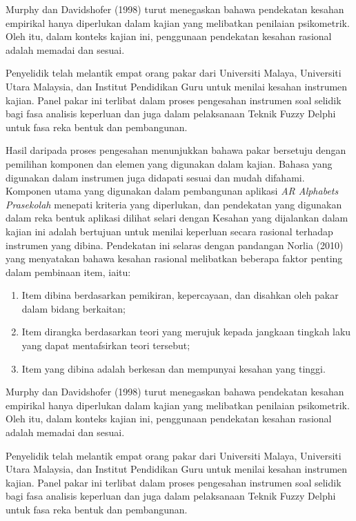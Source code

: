 \begin{itemize}
Murphy dan Davidshofer (1998) turut menegaskan bahawa pendekatan kesahan empirikal hanya diperlukan dalam kajian yang melibatkan penilaian psikometrik. Oleh itu, dalam konteks kajian ini, penggunaan pendekatan kesahan rasional adalah memadai dan sesuai.

Penyelidik telah melantik empat orang pakar dari Universiti Malaya, Universiti Utara Malaysia, dan Institut Pendidikan Guru untuk menilai kesahan instrumen kajian. Panel pakar ini terlibat dalam proses pengesahan instrumen soal selidik bagi fasa analisis keperluan dan juga dalam pelaksanaan Teknik Fuzzy Delphi untuk fasa reka bentuk dan pembangunan.

Hasil daripada proses pengesahan menunjukkan bahawa pakar bersetuju dengan pemilihan komponen dan elemen yang digunakan dalam kajian. Bahasa yang digunakan dalam instrumen juga didapati sesuai dan mudah difahami. Komponen utama yang digunakan dalam pembangunan aplikasi \textit{AR Alphabets Prasekolah} menepati kriteria yang diperlukan, dan pendekatan yang digunakan dalam reka bentuk aplikasi dilihat selari dengan
Kesahan yang dijalankan dalam kajian ini adalah bertujuan untuk menilai keperluan secara rasional terhadap instrumen yang dibina. Pendekatan ini selaras dengan pandangan Norlia (2010) yang menyatakan bahawa kesahan rasional melibatkan beberapa faktor penting dalam pembinaan item, iaitu:

\begin{enumerate}
  \item Item dibina berdasarkan pemikiran, kepercayaan, dan disahkan oleh pakar dalam bidang berkaitan;
  \item Item dirangka berdasarkan teori yang merujuk kepada jangkaan tingkah laku yang dapat mentafsirkan teori tersebut;
  \item Item yang dibina adalah berkesan dan mempunyai kesahan yang tinggi.
\end{enumerate}

Murphy dan Davidshofer (1998) turut menegaskan bahawa pendekatan kesahan empirikal hanya diperlukan dalam kajian yang melibatkan penilaian psikometrik. Oleh itu, dalam konteks kajian ini, penggunaan pendekatan kesahan rasional adalah memadai dan sesuai.

Penyelidik telah melantik empat orang pakar dari Universiti Malaya, Universiti Utara Malaysia, dan Institut Pendidikan Guru untuk menilai kesahan instrumen kajian. Panel pakar ini terlibat dalam proses pengesahan instrumen soal selidik bagi fasa analisis keperluan dan juga dalam pelaksanaan Teknik Fuzzy Delphi untuk fasa reka bentuk dan pembangunan.


\end{itemize}
